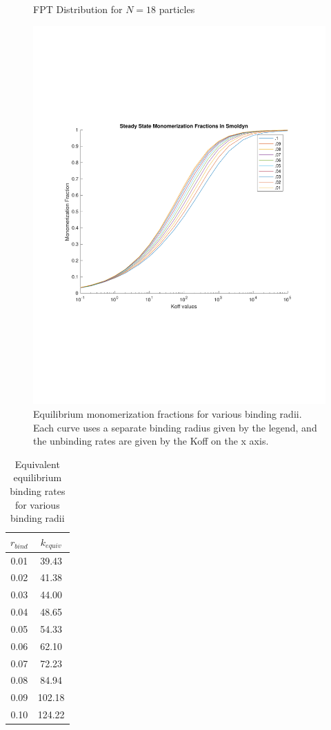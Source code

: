 \documentclass{article}
\begin{document}
\begin{figure}[]
\caption{FPT Distribution for $N=18$ particles}
\label{fig:CDF18}
\end{figure}
\begin{figure}[]
\centering
\includegraphics[scale=0.5]{MonomerizationFractions.pdf}
\caption{Equilibrium monomerization fractions for various binding radii. Each curve uses a separate binding radius given by the legend, and the unbinding rates are given by the Koff on the x axis.}
\label{fig:MonomerEquil}
\end{figure}

\begin{table}[]
    \centering

    \begin{tabular}{||c|c||}
    \hline
    $r_{bind}$ & $k_{equiv}$\\
    \hline\hline
         0.01 & 39.43 \\
         0.02 & 41.38 \\
         0.03 & 44.00 \\
         0.04 & 48.65 \\
         0.05 & 54.33 \\
         0.06 & 62.10 \\
         0.07 & 72.23 \\
         0.08 & 84.94 \\
         0.09 & 102.18 \\
         0.10 & 124.22 \\
         \hline
    \end{tabular}
    \caption{Equivalent equilibrium binding rates for various binding radii}
    \label{tab:Kequiv}
\end{table}
\end{document}
